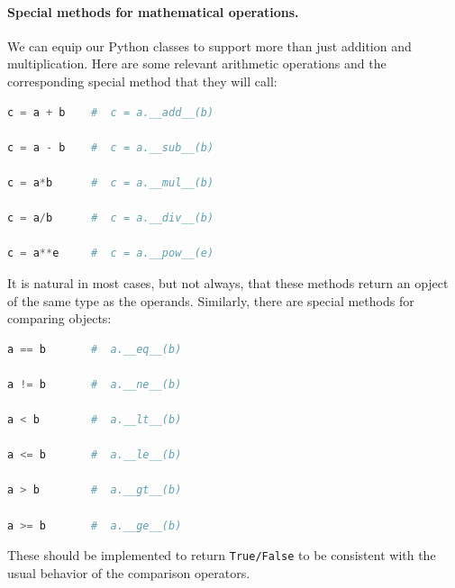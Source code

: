 \documentclass[graybox,envcountchap,sectrefs,final]{svmonodo}
\begin{document}
\paragraph{Special methods for mathematical operations.}
We can equip our Python classes to support more than just addition and multiplication. Here are some relevant
arithmetic operations and the corresponding special method that they will call:
\begin{lstlisting}[language=Python,style=blue1]
c = a + b    #  c = a.__add__(b)

c = a - b    #  c = a.__sub__(b)

c = a*b      #  c = a.__mul__(b)

c = a/b      #  c = a.__div__(b)

c = a**e     #  c = a.__pow__(e)
\end{lstlisting}
It is natural in most cases, but not always, that these methods return an opject of the same type as the operands. Similarly, there are
special methods for comparing objects:
\begin{lstlisting}[language=Python,style=blue1]
a == b       #  a.__eq__(b)

a != b       #  a.__ne__(b)

a < b        #  a.__lt__(b)

a <= b       #  a.__le__(b)

a > b        #  a.__gt__(b)

a >= b       #  a.__ge__(b)
\end{lstlisting}
These should be implemented to return \texttt{True/False} to be consistent with the usual behavior of the comparison operators.
\end{document}
